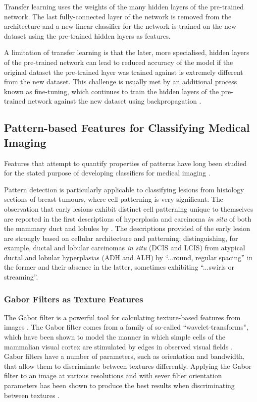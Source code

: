 Transfer learning uses the weights of the many hidden layers of the pre-trained network. The last fully-connected layer of the network is removed from the architecture and a new linear classifier for the network is trained on the new dataset using the pre-trained hidden layers as features.\par

A limitation of transfer learning is that the later, more specialised, hidden layers of the pre-trained network can lead to reduced accuracy of the model if the original dataset the pre-trained layer was trained against is extremely different from the new dataset. This challenge is usually met by an additional process known as fine-tuning, which continues to train the hidden layers of the pre-trained network against the new dataset using backpropagation \citep{yosinski2014}.\par

\subsection{Pattern-based Features for Classifying Medical Imaging}

Features that attempt to quantify properties of patterns have long been studied for the stated purpose of developing classifiers for medical imaging \citep{wolberg1990,meyer2004}.

Pattern detection is particularly applicable to classifying lesions from histology sections of breast tumours, where cell patterning is very significant. The observation that early lesions exhibit distinct cell patterning unique to themselves are reported in the first descriptions of hyperplasia and carcinoma \textit{in situ} of both the mammary duct and lobules by \cite{page1982}. The descriptions provided of the early lesion are strongly based on cellular architecture and patterning; distinguishing, for example, ductal and lobular carcinomas \emph{in situ} (DCIS and LCIS) from atypical ductal and lobular hyperplasias  (ADH and ALH) by ``...round, regular spacing''  in the former and their absence in the latter, sometimes exhibiting ``...swirls or streaming''.\par

\subsubsection{Gabor Filters as Texture Features}
The Gabor filter is a powerful tool for calculating texture-based features from images \citep{fan1993}. The Gabor filter comes from a family of so-called ``wavelet-transforms'', which have been shown to model the manner in which simple cells of the mammalian visual cortex are stimulated by edges in observed visual fields \citep{marcelja1980}. Gabor filters have a number of parameters, such as orientation and bandwidth, that allow them to discriminate between textures differently. Applying the Gabor filter to an image at various resolutions and with sever filter orientation parameters has been shown to produce the best results when discriminating between textures \citep{unser1995}.

